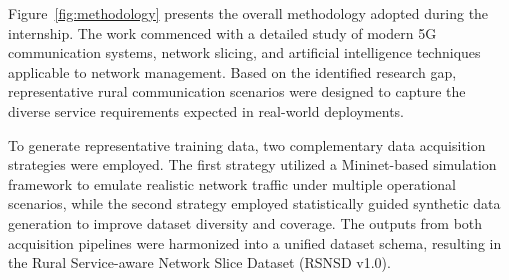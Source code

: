 \documentclass[12pt,a4paper]{report}
\begin{document}

	
	Figure~\ref{fig:methodology} presents the overall methodology adopted during the internship. The work commenced with a detailed study of modern 5G communication systems, network slicing, and artificial intelligence techniques applicable to network management. Based on the identified research gap, representative rural communication scenarios were designed to capture the diverse service requirements expected in real-world deployments.
	
	To generate representative training data, two complementary data acquisition strategies were employed. The first strategy utilized a Mininet-based simulation framework to emulate realistic network traffic under multiple operational scenarios, while the second strategy employed statistically guided synthetic data generation to improve dataset diversity and coverage. The outputs from both acquisition pipelines were harmonized into a unified dataset schema, resulting in the Rural Service-aware Network Slice Dataset (RSNSD v1.0).
	
\end{document}
